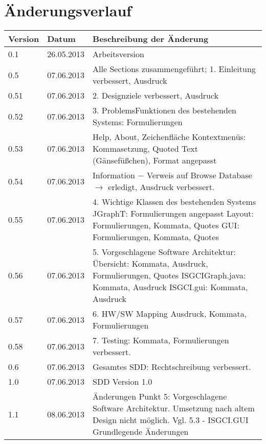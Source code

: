 \documentclass[10pt,a4paper]{article}
\begin{document}
\section{Änderungsverlauf}
\hspace*{-1cm}
\begin{tabular}{|l|l|p{10.5cm}|}\hline
 \textbf{Version}&\textbf{Datum}&\textbf{Beschreibung der \"Anderung}\\\hline
 0.1&26.05.2013&Arbeitsversion\\\hline
 0.5& 07.06.2013 & Alle Sections zusammengeführt; 1. Einleitung verbessert, Ausdruck\\\hline
 0.51& 07.06.2013 & 2. Designziele verbessert, Ausdruck\\\hline
 0.52& 07.06.2013 & 3. ProblemsFunktionen des bestehenden Systems: Formulierungen\\\hline
 0.53& 07.06.2013 & Help, About, Zeichenfläche Kontextmenüs: Kommasetzung, Quoted Text (Gänsefüßchen), Format angepasst\\\hline
 0.54& 07.06.2013 & Information $-$ Verweis auf Browse Database $\rightarrow$ erledigt, \newline
 			      Ausdruck verbessert.\\\hline
 0.55& 07.06.2013 & 4. {Wichtige Klassen des bestehenden Systems}\newline
 				  JGraphT: Formulierungen angepasst\newline
 				  Layout: Formulierungen, Kommata, Quotes      \newline 
 				  GUI: Formulierungen, Kommata, Quotes\\\hline 
 0.56& 07.06.2013 & 5. Vorgeschlagene Software Architektur: \newline
 				  5.1 Übersicht: Kommata, Ausdruck, Formulierungen, Quotes\newline
 				  5.2 ISGCIGraph.java: Kommata, Ausdruck\newline
 				  5.3 ISGCI.gui: Kommata, Ausdruck\\\hline
 0.57& 07.06.2013 & 6. HW/SW Mapping \newline
 					Ausdruck, Kommata, Formulierungen\\\hline
 0.58& 07.06.2013 & 7. Testing: Kommata, Formulierungen verbessert.\\\hline
 0.6& 07.06.2013 & Gesamtes SDD: Rechtschreibung verbessert.\\\hline
 1.0& 07.06.2013 & SDD Version 1.0 \\\hline
 1.1& 08.06.2013 & Änderungen Punkt 5: Vorgeschlagene Software Architektur. \newline Umsetzung nach altem Design nicht möglich. \newline Vgl. 5.3 - ISGCI.GUI Grundlegende Änderungen\\\hline
\end{tabular}\\
\end{document}
